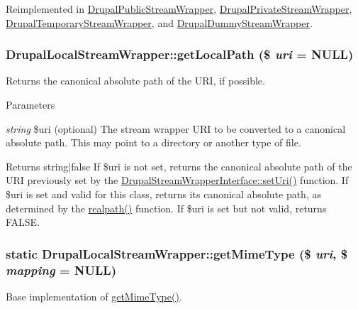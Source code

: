 Reimplemented in \hyperlink{classDrupalPublicStreamWrapper_a2f5fad5a55e907929cae5cd18ab9d151}{DrupalPublicStreamWrapper}, \hyperlink{classDrupalPrivateStreamWrapper_a4440673a974028b3091bfbed80270bd8}{DrupalPrivateStreamWrapper}, \hyperlink{classDrupalTemporaryStreamWrapper_a9ed6d5f9797947b1a6c425b97c17d32d}{DrupalTemporaryStreamWrapper}, and \hyperlink{classDrupalDummyStreamWrapper_a4164ffaf51482dfe9961c5af19bbcb8c}{DrupalDummyStreamWrapper}.\hypertarget{classDrupalLocalStreamWrapper_a68988281b024d7c8ce9e2cf6c1dd1cfa}{
\subsubsection[{getLocalPath}]{\setlength{\rightskip}{0pt plus 5cm}DrupalLocalStreamWrapper::getLocalPath (\$ {\em uri} = {\ttfamily NULL})}}
\label{classDrupalLocalStreamWrapper_a68988281b024d7c8ce9e2cf6c1dd1cfa}
Returns the canonical absolute path of the URI, if possible.


\begin{DoxyParams}{Parameters}
\item[{\em string}]\$uri (optional) The stream wrapper URI to be converted to a canonical absolute path. This may point to a directory or another type of file.\end{DoxyParams}
\begin{DoxyReturn}{Returns}
string$|$false If \$uri is not set, returns the canonical absolute path of the URI previously set by the \hyperlink{interfaceDrupalStreamWrapperInterface_aa04b517df51d24252e656d67515224f6}{DrupalStreamWrapperInterface::setUri()} function. If \$uri is set and valid for this class, returns its canonical absolute path, as determined by the \hyperlink{classDrupalLocalStreamWrapper_a61f0d0ef6a489e3fca2152eb64174237}{realpath()} function. If \$uri is set but not valid, returns FALSE. 
\end{DoxyReturn}
\hypertarget{classDrupalLocalStreamWrapper_ae6baa873a904204192636830d2bacaac}{
\subsubsection[{getMimeType}]{\setlength{\rightskip}{0pt plus 5cm}static DrupalLocalStreamWrapper::getMimeType (\$ {\em uri}, \/  \$ {\em mapping} = {\ttfamily NULL})}}
\label{classDrupalLocalStreamWrapper_ae6baa873a904204192636830d2bacaac}
Base implementation of \hyperlink{classDrupalLocalStreamWrapper_ae6baa873a904204192636830d2bacaac}{getMimeType()}. 

